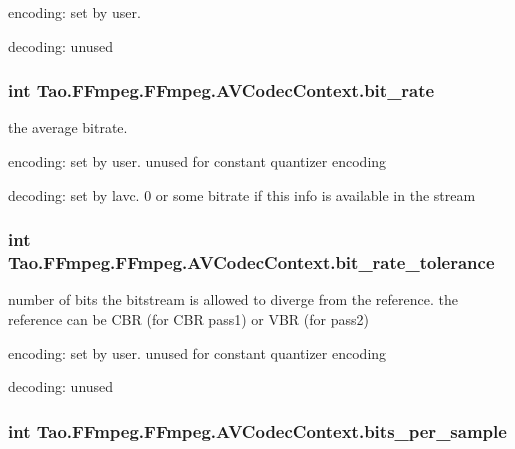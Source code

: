 \begin{DoxyItemize}
\item encoding: set by user.
\item decoding: unused 
\end{DoxyItemize}\hypertarget{struct_tao_1_1_f_fmpeg_1_1_f_fmpeg_1_1_a_v_codec_context_a0a8e50b35f351e617127cb0f91e88759}{
\subsubsection[{bit\_\-rate}]{\setlength{\rightskip}{0pt plus 5cm}int {\bf Tao.FFmpeg.FFmpeg.AVCodecContext.bit\_\-rate}}}
\label{struct_tao_1_1_f_fmpeg_1_1_f_fmpeg_1_1_a_v_codec_context_a0a8e50b35f351e617127cb0f91e88759}
the average bitrate.
\begin{DoxyItemize}
\item encoding: set by user. unused for constant quantizer encoding
\item decoding: set by lavc. 0 or some bitrate if this info is available in the stream 
\end{DoxyItemize}\hypertarget{struct_tao_1_1_f_fmpeg_1_1_f_fmpeg_1_1_a_v_codec_context_a1e73fb42e78886d60d885da09eaed9f2}{
\subsubsection[{bit\_\-rate\_\-tolerance}]{\setlength{\rightskip}{0pt plus 5cm}int {\bf Tao.FFmpeg.FFmpeg.AVCodecContext.bit\_\-rate\_\-tolerance}}}
\label{struct_tao_1_1_f_fmpeg_1_1_f_fmpeg_1_1_a_v_codec_context_a1e73fb42e78886d60d885da09eaed9f2}
number of bits the bitstream is allowed to diverge from the reference. the reference can be CBR (for CBR pass1) or VBR (for pass2)
\begin{DoxyItemize}
\item encoding: set by user. unused for constant quantizer encoding
\item decoding: unused 
\end{DoxyItemize}\hypertarget{struct_tao_1_1_f_fmpeg_1_1_f_fmpeg_1_1_a_v_codec_context_a454b690eac52e8344e0001a10657ba56}{
\subsubsection[{bits\_\-per\_\-sample}]{\setlength{\rightskip}{0pt plus 5cm}int {\bf Tao.FFmpeg.FFmpeg.AVCodecContext.bits\_\-per\_\-sample}}}

